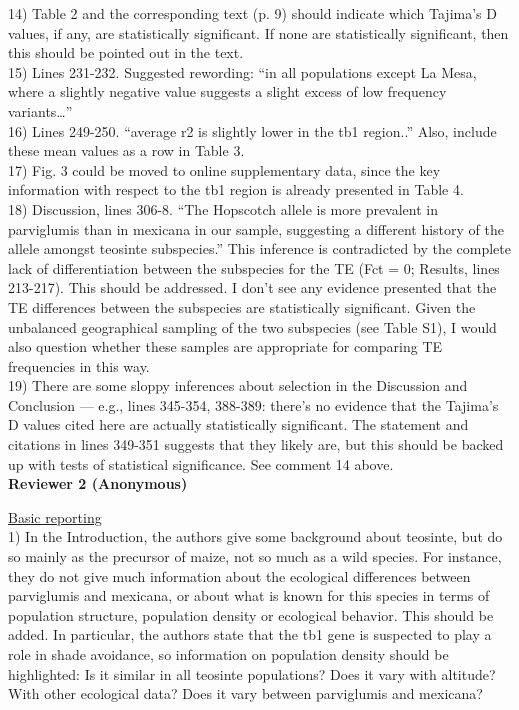 \documentclass[]{article}
\begin{document}
14) Table 2 and the corresponding text (p. 9) should indicate which Tajima’s D values, if any, are statistically significant. If none are statistically significant, then this should be pointed out in the text. \\

15) Lines 231-232. Suggested rewording: “in all populations except La Mesa, where a slightly negative value suggests a slight excess of low frequency variants…”\\

16) Lines 249-250. “average r2 is slightly lower in the tb1 region..” Also, include these mean values as a row in Table 3. \\

17) Fig. 3 could be moved to online supplementary data, since the key information with respect to the tb1 region is already presented in Table 4. \\

18) Discussion, lines 306-8. “The Hopscotch allele is more prevalent in parviglumis than in mexicana in our sample, suggesting a different history of the allele amongst teosinte subspecies.” This inference is contradicted by the complete lack of differentiation between the subspecies for the TE (Fct = 0; Results, lines 213-217). This should be addressed. I don’t see any evidence presented that the TE differences between the subspecies are statistically significant. Given the unbalanced geographical sampling of the two subspecies (see Table S1), I would also question whether these samples are appropriate for comparing TE frequencies in this way. \\

19) There are some sloppy inferences about selection in the Discussion and Conclusion — e.g., lines 345-354, 388-389: there’s no evidence that the Tajima’s D values cited here are actually statistically significant. The statement and citations in lines 349-351 suggests that they likely are, but this should be backed up with tests of statistical significance. See comment 14 above.\\

\textbf{Reviewer 2 (Anonymous)}

\underline{Basic reporting}\\

1) In the Introduction, the authors give some background about teosinte, but do so mainly as the precursor of maize, not so much as a wild species. For instance, they do not give much information about the ecological differences between parviglumis and mexicana, or about what is known for this species in terms of population structure, population density or ecological behavior. This should be added. In particular, the authors state that the tb1 gene is suspected to play a role in shade avoidance, so information on population density should be highlighted: Is it similar in all teosinte populations? Does it vary with altitude? With other ecological data? Does it vary between parviglumis and mexicana?\\
\end{document}
